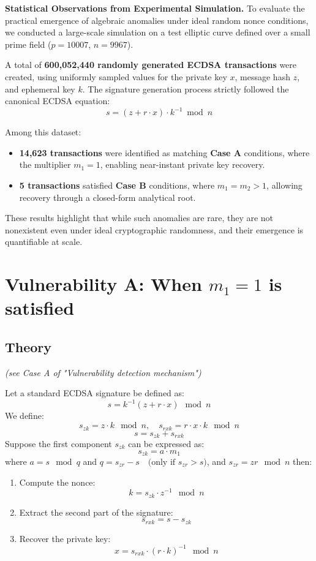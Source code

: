 \documentclass[11pt]{article}
\begin{document}
\noindent\textbf{Statistical Observations from Experimental Simulation.}
To evaluate the practical emergence of algebraic anomalies under ideal random nonce conditions, we conducted a large-scale simulation on a test elliptic curve defined over a small prime field ($p = 10007$, $n = 9967$).

A total of \textbf{600,052,440 randomly generated ECDSA transactions} were created, using uniformly sampled values for the private key $x$, message hash $z$, and ephemeral key $k$. The signature generation process strictly followed the canonical ECDSA equation:
\[
s = (z + r \cdot x) \cdot k^{-1} \bmod n
\]

Among this dataset:
\begin{itemize}
  \item \textbf{14,623 transactions} were identified as matching \textbf{Case A} conditions, where the multiplier $m_1 = 1$, enabling near-instant private key recovery.
  \item \textbf{5 transactions} satisfied \textbf{Case B} conditions, where $m_1 = m_2 > 1$, allowing recovery through a closed-form analytical root.
\end{itemize}

These results highlight that while such anomalies are rare, they are not nonexistent even under ideal cryptographic randomness, and their emergence is quantifiable at scale.


\section{Vulnerability A: When \texorpdfstring{$m_1 = 1$}{m1 = 1} is satisfied}

\subsection{Theory}
\textit{(see Case A of "Vulnerability detection mechanism")}

Let a standard ECDSA signature be defined as:
\[
s = k^{-1}(z + r \cdot x) \mod n
\]
We define:
\[
s_{zk} = z \cdot k \mod n,\quad
s_{rxk} = r \cdot x \cdot k \mod n
\]
\[
s = s_{zk} + s_{rxk}
\]
Suppose the first component $s_{zk}$ can be expressed as:
\[
s_{zk} = a \cdot m_1
\]
where $a = s \mod q$ and $q = s_{zr} - s \quad \text{(only if } s_{zr} > s \text{)}$, and $s_{zr} = zr \mod n$ then:
\begin{enumerate}
    \item Compute the nonce:
    \[
    k = s_{zk} \cdot z^{-1} \mod n
    \]
    \item Extract the second part of the signature:
    \[
    s_{rxk} = s - s_{zk}
    \]
    \item Recover the private key:
    \[
    x = s_{rxk} \cdot (r \cdot k)^{-1} \mod n
    \]
\end{enumerate}
\end{document}
